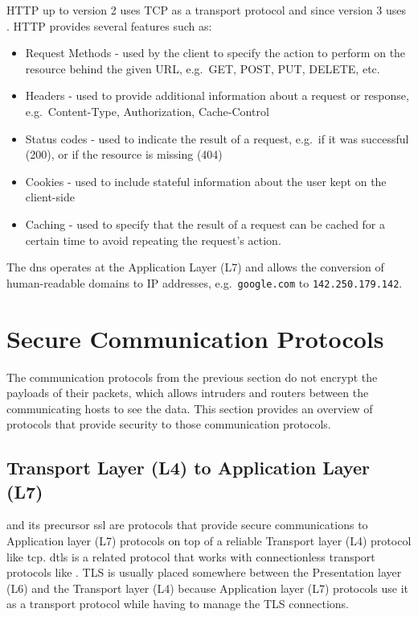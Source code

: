 HTTP up to version 2 uses TCP as a transport protocol and since version 3 uses . HTTP provides several features such as:

\begin{itemize}
\tightlist
\item
  Request Methods - used by the client to specify the action to perform on the resource behind the given URL, e.g.~GET, POST, PUT, DELETE, etc.
\item
  Headers - used to provide additional information about a request or response, e.g.~Content-Type, Authorization, Cache-Control
\item
  Status codes - used to indicate the result of a request, e.g.~if it was successful (200), or if the resource is missing (404)
\item
  Cookies - used to include stateful information about the user kept on the client-side
\item
  Caching - used to specify that the result of a request can be cached for a certain time to avoid repeating the request's action.
\end{itemize}

The \gls{dns} operates at the Application Layer (L7) and allows the conversion of human-readable domains to IP addresses, e.g.~\texttt{google.com} to \texttt{142.250.179.142}.

\section{Secure Communication Protocols}\label{thesis__020-internet.md__secure-communication-protocols}

The communication protocols from the previous section do not encrypt the payloads of their packets, which allows intruders and routers between the communicating hosts to see the data. This section provides an overview of protocols that provide security to those communication protocols.

\subsection{Transport Layer (L4) to Application Layer (L7)}\label{thesis__020-internet.md__transport-layer-l4-to-application-layer-l7}

 \autocite{tlsRFC} and its precursor \gls{ssl} are protocols that provide secure communications to Application layer (L7) protocols on top of a reliable Transport layer (L4) protocol like \gls{tcp}. \gls{dtls} is a related protocol that works with connectionless transport protocols like . TLS is usually placed somewhere between the Presentation layer (L6) and the Transport layer (L4) because Application layer (L7) protocols use it as a transport protocol while having to manage the TLS connections.

